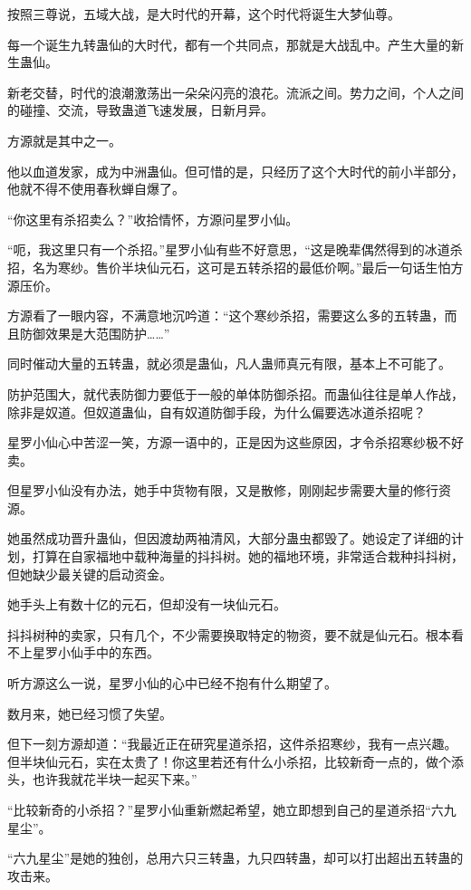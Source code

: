 \begin{this_body}
按照三尊说，五域大战，是大时代的开幕，这个时代将诞生大梦仙尊。

每一个诞生九转蛊仙的大时代，都有一个共同点，那就是大战乱中。产生大量的新生蛊仙。

新老交替，时代的浪潮激荡出一朵朵闪亮的浪花。流派之间。势力之间，个人之间的碰撞、交流，导致蛊道飞速发展，日新月异。

方源就是其中之一。

他以血道发家，成为中洲蛊仙。但可惜的是，只经历了这个大时代的前小半部分，他就不得不使用春秋蝉自爆了。

“你这里有杀招卖么？”收拾情怀，方源问星罗小仙。

“呃，我这里只有一个杀招。”星罗小仙有些不好意思，“这是晚辈偶然得到的冰道杀招，名为寒纱。售价半块仙元石，这可是五转杀招的最低价啊。”最后一句话生怕方源压价。

方源看了一眼内容，不满意地沉吟道：“这个寒纱杀招，需要这么多的五转蛊，而且防御效果是大范围防护……”

同时催动大量的五转蛊，就必须是蛊仙，凡人蛊师真元有限，基本上不可能了。

防护范围大，就代表防御力要低于一般的单体防御杀招。而蛊仙往往是单人作战，除非是奴道。但奴道蛊仙，自有奴道防御手段，为什么偏要选冰道杀招呢？

星罗小仙心中苦涩一笑，方源一语中的，正是因为这些原因，才令杀招寒纱极不好卖。

但星罗小仙没有办法，她手中货物有限，又是散修，刚刚起步需要大量的修行资源。

她虽然成功晋升蛊仙，但因渡劫两袖清风，大部分蛊虫都毁了。她设定了详细的计划，打算在自家福地中载种海量的抖抖树。她的福地环境，非常适合栽种抖抖树，但她缺少最关键的启动资金。

她手头上有数十亿的元石，但却没有一块仙元石。

抖抖树种的卖家，只有几个，不少需要换取特定的物资，要不就是仙元石。根本看不上星罗小仙手中的东西。

听方源这么一说，星罗小仙的心中已经不抱有什么期望了。

数月来，她已经习惯了失望。

但下一刻方源却道：“我最近正在研究星道杀招，这件杀招寒纱，我有一点兴趣。但半块仙元石，实在太贵了！你这里若还有什么小杀招，比较新奇一点的，做个添头，也许我就花半块一起买下来。”

“比较新奇的小杀招？”星罗小仙重新燃起希望，她立即想到自己的星道杀招“六九星尘”。

“六九星尘”是她的独创，总用六只三转蛊，九只四转蛊，却可以打出超出五转蛊的攻击来。


\end{this_body}
